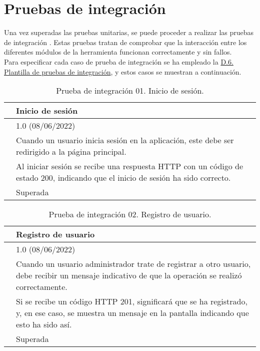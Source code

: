 \section{Pruebas de integración}

Una vez superadas las pruebas unitarias, se puede proceder a realizar las pruebas de integración \cite{pruebaintegracion}. Estas pruebas tratan de comprobar que la interacción entre los diferentes módulos de la herramienta funcionan correctamente y sin fallos. 
\\

Para especificar cada caso de prueba de integración se ha empleado la \hyperref[enlacePIX]{D.6. Plantilla de pruebas de integración}, y estos casos se muestran a continuación.

\begin{table}[H]
\begin{center}
\begin{tabular}{|p{3cm}|p{10cm}|} \hline
\centering {\bf PI-01} & Inicio de sesión  \\ \hline\hline
\centering {\bf Versión} & 1.0 (08/06/2022) \\ \hline
\centering {\bf Descripción} & Cuando un usuario inicia sesión en la aplicación, este debe ser redirigido a la página principal. \\ \hline
\centering {\bf Criterio de aceptación} & Al iniciar sesión se recibe una respuesta HTTP con un código de estado 200, indicando que el inicio de sesión ha sido correcto. \\ \hline
\centering {\bf Estado} & Superada \\ \hline
\end{tabular}
\caption{Prueba de integración 01. Inicio de sesión.}
\label{enlacePI1}
\end{center}
\end{table}

\begin{table}[H]
\begin{center}
\begin{tabular}{|p{3cm}|p{10cm}|} \hline
\centering {\bf PI-02} & Registro de usuario  \\ \hline\hline
\centering {\bf Versión} & 1.0 (08/06/2022) \\ \hline
\centering {\bf Descripción} & Cuando un usuario administrador trate de registrar a otro usuario, debe recibir un mensaje indicativo de que la operación se realizó correctamente. \\ \hline
\centering {\bf Criterio de aceptación} & Si se recibe un código HTTP 201, significará que se ha registrado, y, en ese caso, se muestra un mensaje en la pantalla indicando que esto ha sido así. \\ \hline
\centering {\bf Estado} & Superada \\ \hline
\end{tabular}
\caption{Prueba de integración 02. Registro de usuario.}
\label{enlacePI2}
\end{center}
\end{table}

